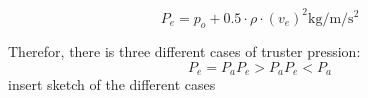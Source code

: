 \begin{equation}
P_e = p_o + 0.5 \cdot \rho \cdot(v_e)^2 \si{\kilo\gram\per\meter\per\second\squared} \label{eq:P_e}
\end{equation}
\startexplain
{}
\stopexplain

Therefor, there is three different cases of truster pression:
\begin{equation}
P_e = P_a
P_e > P_a
P_e < P_a
\end{equation}
 insert sketch of the different cases





